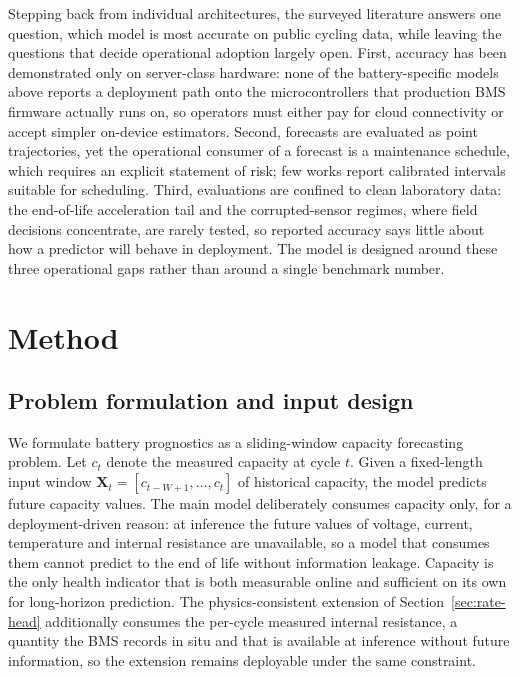 \documentclass[final,5p,times,twocolumn]{elsarticle}
\begin{document}
Stepping back from individual architectures, the surveyed literature
answers one question, which model is most accurate on public cycling
data, while leaving the questions that decide operational adoption
largely open. First, accuracy has been demonstrated only on
server-class hardware: none of the battery-specific models above
reports a deployment path onto the microcontrollers that production
BMS firmware actually runs on, so operators must either pay for
cloud connectivity or accept simpler on-device estimators. Second,
forecasts are evaluated as point trajectories, yet the operational
consumer of a forecast is a maintenance schedule, which requires an
explicit statement of risk; few works report calibrated intervals
suitable for scheduling. Third, evaluations are confined to clean
laboratory data: the end-of-life acceleration tail and the
corrupted-sensor regimes, where field decisions concentrate, are
rarely tested, so reported accuracy says little about how a
predictor will behave in deployment. The model is designed around
these three operational gaps rather than around a single benchmark
number.

\section{Method}
\label{sec:method}

\subsection{Problem formulation and input design}
\label{sec:formulation}

We formulate battery prognostics as a sliding-window capacity
forecasting problem. Let $c_t$ denote the measured capacity at cycle
$t$. Given a fixed-length input window
$\mathbf{X}_{t} = [c_{t-W+1}, \ldots, c_t]$ of historical capacity,
the model predicts future capacity values. The main model
deliberately consumes capacity only, for a deployment-driven
reason: at inference the future values of voltage, current,
temperature and internal resistance are unavailable, so a model that
consumes them cannot predict to the end of life without information
leakage. Capacity is the only health indicator that is both
measurable online and sufficient on its own for long-horizon
prediction. The physics-consistent extension of
Section~\ref{sec:rate-head} additionally consumes the per-cycle
measured internal resistance, a quantity the BMS records in
situ and that is available at inference without future information, so the
extension remains deployable under the same constraint.
\end{document}
